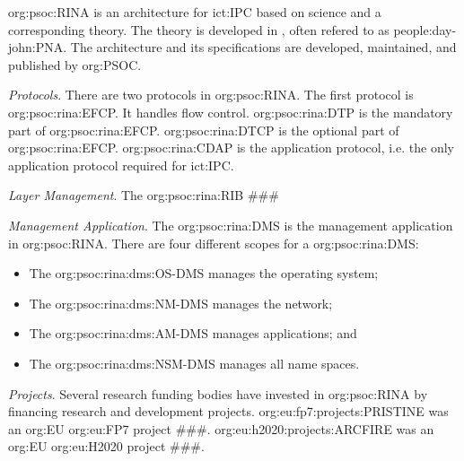 \acs{org:psoc:RINA} is an architecture for \ac{ict:IPC} based on science and a corresponding theory.
The theory is developed in , often refered to as \ac{people:day-john:PNA}.
The architecture and its specifications are developed, maintained, and published by \ac{org:PSOC}.

\textit{Protocols}.
There are two protocols in \acs{org:psoc:RINA}.
The first protocol is \ac{org:psoc:rina:EFCP}.
It handles flow control.
\ac{org:psoc:rina:DTP} is the mandatory part of \ac{org:psoc:rina:EFCP}.
\ac{org:psoc:rina:DTCP} is the optional part of \ac{org:psoc:rina:EFCP}.
\ac{org:psoc:rina:CDAP} is the application protocol, i.e. the only application protocol required for \ac{ict:IPC}.

\textit{Layer Management}.
The \ac{org:psoc:rina:RIB} \#\#\#

\textit{Management Application}.
The \ac{org:psoc:rina:DMS} is the management application in \acs{org:psoc:RINA}.
There are four different scopes for a \ac{org:psoc:rina:DMS}:
    \begin{itemize}[topsep=0pt, partopsep=0pt, nosep]
        \item The \ac{org:psoc:rina:dms:OS-DMS} manages the operating system;
        \item The \ac{org:psoc:rina:dms:NM-DMS} manages the network;
        \item The \ac{org:psoc:rina:dms:AM-DMS} manages applications; and
        \item The \ac{org:psoc:rina:dms:NSM-DMS} manages all name spaces.
    \end{itemize}

\textit{Projects}.
Several research funding bodies have invested in \acs{org:psoc:RINA} by financing research and development projects.
    \acs{org:eu:fp7:projects:PRISTINE} was an \acs{org:EU} \acs{org:eu:FP7} project \#\#\#.
    \acs{org:eu:h2020:projects:ARCFIRE} was an \acs{org:EU} \acs{org:eu:H2020} project \#\#\#.

